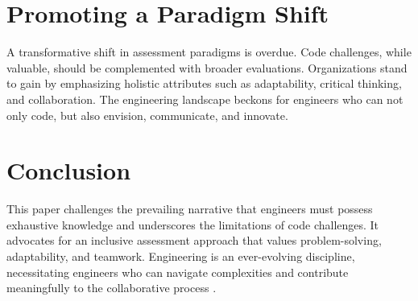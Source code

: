 \documentclass[
    a4paper, %
    10pt, %
    unnumberedsections, %
    twoside, %
]{LTJournalArticle}
\begin{document}
\section{Promoting a Paradigm Shift}

A transformative shift in assessment paradigms is overdue. Code challenges, while valuable, should be complemented with broader evaluations. Organizations stand to gain by emphasizing holistic attributes such as adaptability, critical thinking, and collaboration. The engineering landscape beckons for engineers who can not only code, but also envision, communicate, and innovate.


\section{Conclusion}

This paper challenges the prevailing narrative that engineers must possess exhaustive knowledge and underscores the limitations of code challenges. It advocates for an inclusive assessment approach that values problem-solving, adaptability, and teamwork. Engineering is an ever-evolving discipline, necessitating engineers who can navigate complexities and contribute meaningfully to the collaborative process \cite{Smith2020,Johnson2019,Brown2021,Garcia2022}.


\printbibliography %

\end{document}
